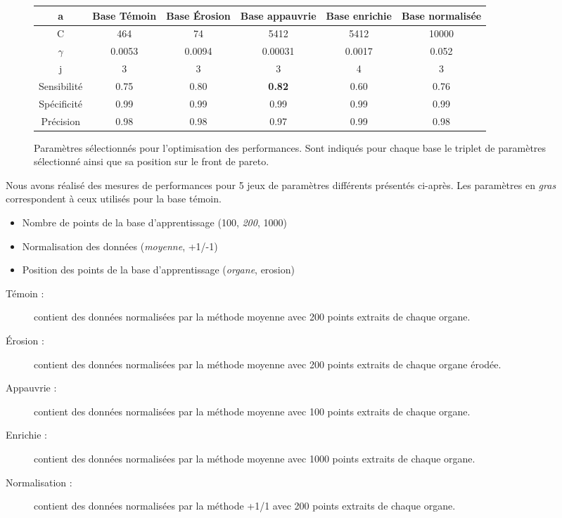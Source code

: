 \begin{figure}[h!]
\label{fig:paramsParams}
		\begin{tabular}{c c c c c c}
  \hline
  a	& Base Témoin 	& Base Érosion	& Base appauvrie& Base enrichie & Base normalisée \\
  \hline
 C 	& 464		& 74		& 5412		& 5412		& 10000 \\
\hline
$\gamma$& 0.0053	& 0.0094	& 0.00031	& 0.0017	& 0.052 \\
\hline
j	& 3		& 3		& 3		& 4		& 3	\\
\hline
\hline
Sensibilité& 0.75	& 0.80		& \textbf{0.82}		& 0.60		& 0.76	\\
\hline
Spécificité& 0.99	& 0.99		& 0.99		& 0.99		& 0.99 \\
\hline
Précision& 0.98		& 0.98		& 0.97		& 0.99		& 0.98 \\
\hline
 		\end{tabular}

\caption{Paramètres sélectionnés pour l'optimisation des performances. Sont indiqués pour chaque base le triplet de paramètres sélectionné ainsi que sa position sur le front de pareto.}
\end{figure}






Nous avons réalisé des mesures de performances pour 5 jeux de paramètres différents présentés ci-après. Les paramètres en \emph{gras} correspondent à ceux utilisés pour la base témoin.

\begin{itemize}
 \item Nombre de points de la base d'apprentissage (100, \emph{200}, 1000)
 \item Normalisation des données (\emph{moyenne}, +1/-1)
 \item Position des points de la base d'apprentissage (\emph{organe}, erosion)
\end{itemize}


\begin{description}
 \item[Témoin : ] contient des données normalisées par la méthode moyenne avec 200 points extraits de chaque organe.
 \item[\'Erosion : ] contient des données normalisées par la méthode moyenne avec 200 points extraits de chaque organe érodée.
 \item[Appauvrie : ] contient des données normalisées par la méthode moyenne avec 100 points extraits de chaque organe.
 \item[Enrichie : ] contient des données normalisées par la méthode moyenne avec 1000 points extraits de chaque organe.
 \item[Normalisation : ] contient des données normalisées par la méthode +1/1 avec 200 points extraits de chaque organe.
\end{description}


